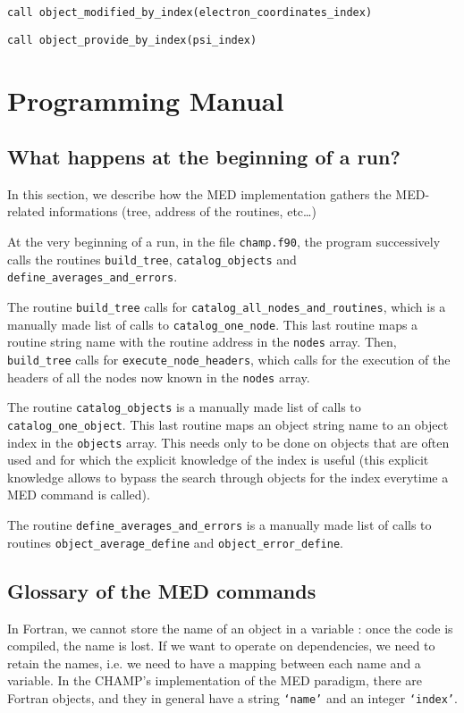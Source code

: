 \documentclass[a4paper,11pt]{article}
\begin{document}
\vspace{0.5cm}
\noindent
{\tt call object_modified_by_index(electron_coordinates_index)}

\vspace{0.5cm}
\noindent
{\tt call object_provide_by_index(psi_index)}


\section{Programming Manual}

\subsection{What happens at the beginning of a run?}

In this section, we describe how the MED implementation gathers the MED-related informations (tree, address of the routines, etc\dots)

At the very beginning of a run, in the file {\tt champ.f90}, the program successively calls the routines {\tt build_tree}, {\tt catalog_objects} and {\tt define_averages_and_errors}.

The routine {\tt build_tree} calls for {\tt catalog_all_nodes_and_routines}, which is a manually made list of calls to {\tt catalog_one_node}. This last routine maps a routine string name with the routine address in the {\tt nodes} array. Then, {\tt build_tree} calls for {\tt execute_node_headers}, which calls for the execution of the headers of all the nodes now known in the {\tt nodes} array.

The routine {\tt catalog_objects} is a manually made list of calls to {\tt catalog_one_object}. This last routine maps an object string name to an object index in the {\tt objects} array. This needs only to be done on objects that are often used and for which the explicit knowledge of the index is useful (this explicit knowledge allows to bypass the search through objects for the index everytime a MED command is called).

The routine {\tt define_averages_and_errors} is a manually made list of calls to routines {\tt object_average_define} and {\tt object_error_define}.

\subsection{Glossary of the MED commands}

In Fortran, we cannot store the name of an object in a variable : once the code is compiled, the name is lost.
If we want to operate on dependencies, we need to retain the names, i.e. we need to have a mapping between each name and a variable.
In the CHAMP's implementation of the MED paradigm, there are Fortran objects, and they in general have a string {\tt `name'} and an integer {\tt `index'}.
\end{document}
